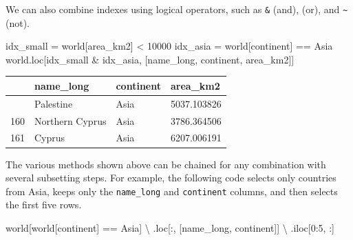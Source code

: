 \documentclass[
  letterpaper,
]{krantz}
\newenvironment{Shaded}{\begin{snugshade}}{\end{snugshade}}
\newcommand{\DecValTok}[1]{\textcolor[rgb]{0.68,0.00,0.00}{#1}}
\newcommand{\NormalTok}[1]{\textcolor[rgb]{0.00,0.23,0.31}{#1}}
\newcommand{\OperatorTok}[1]{\textcolor[rgb]{0.37,0.37,0.37}{#1}}
\newcommand{\StringTok}[1]{\textcolor[rgb]{0.13,0.47,0.30}{#1}}
\begin{document}
We can also combine indexes using logical operators, such as \texttt{\&}
(and), \texttt{\textbar{}} (or), and \texttt{\textasciitilde{}} (not).

\begin{Shaded}
\begin{Highlighting}[]
\NormalTok{idx\_small }\OperatorTok{=}\NormalTok{ world[}\StringTok{\textquotesingle{}area\_km2\textquotesingle{}}\NormalTok{] }\OperatorTok{\textless{}} \DecValTok{10000}
\NormalTok{idx\_asia }\OperatorTok{=}\NormalTok{ world[}\StringTok{\textquotesingle{}continent\textquotesingle{}}\NormalTok{] }\OperatorTok{==} \StringTok{\textquotesingle{}Asia\textquotesingle{}}
\NormalTok{world.loc[idx\_small }\OperatorTok{\&}\NormalTok{ idx\_asia, [}\StringTok{\textquotesingle{}name\_long\textquotesingle{}}\NormalTok{, }\StringTok{\textquotesingle{}continent\textquotesingle{}}\NormalTok{, }\StringTok{\textquotesingle{}area\_km2\textquotesingle{}}\NormalTok{]]}
\end{Highlighting}
\end{Shaded}

\begin{longtable}[]{@{}llll@{}}
\toprule\noalign{}
& name\_long & continent & area\_km2 \\
\midrule\noalign{}
\endhead
\bottomrule\noalign{}
\endlastfoot
79 & Palestine & Asia & 5037.103826 \\
160 & Northern Cyprus & Asia & 3786.364506 \\
161 & Cyprus & Asia & 6207.006191 \\
\end{longtable}

The various methods shown above can be chained for any combination with
several subsetting steps. For example, the following code selects only
countries from Asia, keeps only the \texttt{name\_long} and
\texttt{continent} columns, and then selects the first five rows.

\begin{Shaded}
\begin{Highlighting}[]
\NormalTok{world[world[}\StringTok{\textquotesingle{}continent\textquotesingle{}}\NormalTok{] }\OperatorTok{==} \StringTok{\textquotesingle{}Asia\textquotesingle{}}\NormalTok{]  }\OperatorTok{\textbackslash{}}
\NormalTok{    .loc[:, [}\StringTok{\textquotesingle{}name\_long\textquotesingle{}}\NormalTok{, }\StringTok{\textquotesingle{}continent\textquotesingle{}}\NormalTok{]]  }\OperatorTok{\textbackslash{}}
\NormalTok{    .iloc[}\DecValTok{0}\NormalTok{:}\DecValTok{5}\NormalTok{, :]}
\end{Highlighting}
\end{Shaded}
\end{document}
